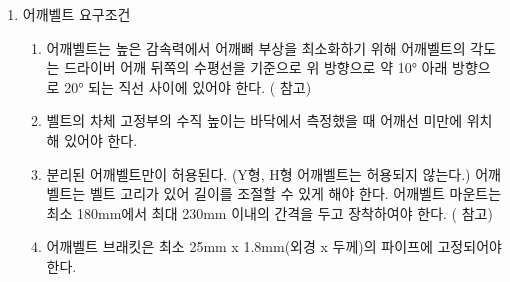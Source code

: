 \documentclass[final,a4paper,10pt]{report}
\begin{document}
\begin{enumerate}
\begin{enumerate}
        \item\label{rule:formula-technical.safety-belt.lap-belt.angle-and-anchor-point} 벨트 착용 시 측면에서 바라볼 때, 허리벨트 각도와 고정점의 위치는 아래와 같다. ( 참고)
          \begin{enumerate}
            \item\label{rule:formula-technical.safety-belt.lap-belt.angle-and-anchor-point.anchor-behind-seat-back} 허리벨트 고정점은 시트 뒤끝 지점에서 0 \string~ 75mm 사이에 있어야 한다.
            \item\label{rule:formula-technical.safety-belt.lap-belt.angle-and-anchor-point.standard-belt-angle} 허리벨트는 지면과 45° \string~ 65°를 이루어야 한다. ( 좌측 참고)
            \item\label{rule:formula-technical.safety-belt.lap-belt.angle-and-anchor-point.reclined-belt-angle} 드라이버의 상반신이 지면에서 60˚ 이하인 경우 벨트는 지면과 60° \string~ 80°를 이루어야 한다. ( 우측 참고)
          \end{enumerate}

      \end{enumerate}
    \item\label{rule:formula-technical.safety-belt.shoulder-belt} 어깨벨트 요구조건
      \begin{enumerate}
        \item\label{rule:formula-technical.safety-belt.shoulder-belt.angle-to-shoulder-horizontal} 어깨벨트는 높은 감속력에서 어깨뼈 부상을 최소화하기 위해 어깨벨트의 각도는 드라이버 어깨 뒤쪽의 수평선을 기준으로 위 방향으로 약 10° 아래 방향으로 20° 되는 직선 사이에 있어야 한다. ( 참고)
        \item\label{rule:formula-technical.safety-belt.shoulder-belt.anchor-below-shoulder-line} 벨트의 차체 고정부의 수직 높이는 바닥에서 측정했을 때 어깨선 미만에 위치해 있어야 한다.
        \item\label{rule:formula-technical.safety-belt.shoulder-belt.separate-belts-mount-spacing} 분리된 어깨벨트만이 허용된다. (Y형, H형 어깨벨트는 허용되지 않는다.) 어깨벨트는 벨트 고리가 있어 길이를 조절할 수 있게 해야 한다. 어깨벨트 마운트는 최소 180mm에서 최대 230mm 이내의 간격을 두고 장착하여야 한다. ( 참고)
        \item\label{rule:formula-technical.safety-belt.shoulder-belt.bracket-min-tube-size} 어깨벨트 브래킷은 최소 25mm x 1.8mm(외경 x 두께)의 파이프에 고정되어야 한다.


\end{enumerate}
\end{enumerate}
\end{document}
